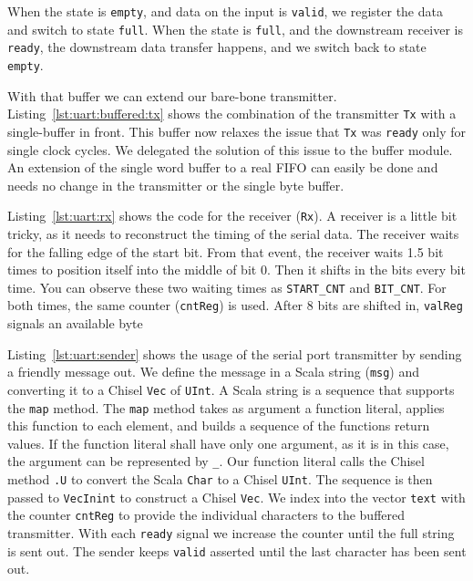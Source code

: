 \documentclass[%
    10pt,
    headinclude, footexclude,
    openright, %
    notitlepage,
    cleardoubleempty,
    headsepline,
    pointlessnumbers,
    bibtotoc, idxtotoc,
    ]{scrbook}
\newcommand{\code}[1]{{\small{\texttt{#1}}}}
\begin{document}
{When the state is \code{empty}, and data on the input is \code{valid},
we register the data and switch to state \code{full}.
When the state is \code{full}, and the downstream receiver is
\code{ready}, the downstream data transfer happens, and we switch
back to state \code{empty}.

With that buffer we can extend our bare-bone transmitter.
Listing~\ref{lst:uart:buffered:tx} shows the combination of the transmitter \code{Tx}
with a single-buffer in front. This buffer now relaxes the issue that \code{Tx}
was \code{ready} only for single clock cycles. We delegated the solution of
this issue to the buffer module.
An extension of the single word buffer to a real FIFO can easily be done
and needs no change in the transmitter or the single byte buffer.

Listing~\ref{lst:uart:rx} shows the code for the receiver (\code{Rx}).
A receiver is a little bit tricky, as it needs to reconstruct the timing of
the serial data. The receiver waits for the falling edge of the start bit.
From that event, the receiver waits 1.5 bit times to position itself into the middle
of bit 0. Then it shifts in the bits every bit time. You can observe these
two waiting times as \code{START\_CNT} and \code{BIT\_CNT}.
For both times, the same counter (\code{cntReg}) is used.
After 8 bits are shifted in, \code{valReg} signals an available byte

Listing~\ref{lst:uart:sender} shows the usage of the serial port transmitter
by sending a friendly message out. We define the message in a Scala
string (\code{msg}) and converting it to a Chisel \code{Vec} of \code{UInt}.
A Scala string is a sequence that supports the \code{map} method.
The \code{map} method takes as argument a function literal, applies this function to
each element, and builds a sequence of the functions return values.
If the function literal shall have only one argument, as it is in this case, the
argument can be represented by \code{\_}. Our function literal calls
the Chisel method \code{.U} to convert the Scala \code{Char} to a Chisel
\code{UInt}. The sequence is then passed to \code{VecInint} to construct
a Chisel \code{Vec}. We index into the vector \code{text} with the counter
\code{cntReg} to provide the individual characters to the buffered transmitter.
With each \code{ready} signal we increase the counter until the full string
is sent out. The sender keeps \code{valid} asserted until the last character
has been sent out.

}
\end{document}
